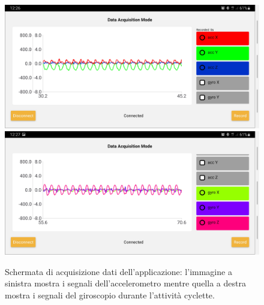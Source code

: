 \begin{figure}[h]
	\centering
	\includegraphics[width=0.49\linewidth]{./ImageFiles/acquisition_acc.jpg}
	\includegraphics[width=0.49\linewidth]{./ImageFiles/acquisition_gyro.jpg}
	\caption{Schermata di acquisizione dati dell'applicazione: l'immagine a sinistra mostra i segnali dell'accelerometro mentre quella a destra mostra i segnali del giroscopio durante l'attività cyclette.}
	\label{fig:schermata_acq}
\end{figure}

